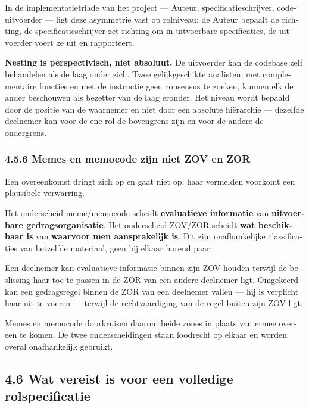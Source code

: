 \begin{dutch}
In de implementatietriade van het project — Auteur, specificatieschrijver, code-uitvoerder — ligt deze asymmetrie vast op rolniveau: de Auteur bepaalt de richting, de specificatieschrijver zet richting om in uitvoerbare specificaties, de uitvoerder voert ze uit en rapporteert.

\textbf{Nesting is perspectivisch, niet absoluut.} De uitvoerder kan de codebase zelf behandelen als de laag onder zich. Twee gelijkgeschikte analisten, met complementaire functies en met de instructie geen consensus te zoeken, kunnen elk de ander beschouwen als bezetter van de laag eronder. Het niveau wordt bepaald door de positie van de waarnemer en niet door een absolute hiërarchie — dezelfde deelnemer kan voor de ene rol de bovengrens zijn en voor de andere de ondergrens.


\subsubsection*{4.5.6 Memes en memocode zijn niet ZOV en ZOR}
\label{sec:nl:4.5.6}

Een overeenkomst dringt zich op en gaat niet op; haar vermelden voorkomt een plausibele verwarring.

Het onderscheid meme/memocode scheidt \textbf{evaluatieve informatie} van \textbf{uitvoerbare gedragsorganisatie}. Het onderscheid ZOV/ZOR scheidt \textbf{wat beschikbaar is} van \textbf{waarvoor men aansprakelijk is}. Dit zijn onafhankelijke classificaties van hetzelfde materiaal, geen bij elkaar horend paar.

Een deelnemer kan evaluatieve informatie binnen zijn ZOV houden terwijl de beslissing haar toe te passen in de ZOR van een andere deelnemer ligt. Omgekeerd kan een gedragsregel binnen de ZOR van een deelnemer vallen — hij is verplicht haar uit te voeren — terwijl de rechtvaardiging van de regel buiten zijn ZOV ligt.

Memes en memocode doorkruisen daarom beide zones in plaats van ermee overeen te komen. De twee onderscheidingen staan loodrecht op elkaar en worden overal onafhankelijk gebruikt.


\subsection*{4.6 Wat vereist is voor een volledige rolspecificatie}
\label{sec:nl:4.6}


\end{dutch}
